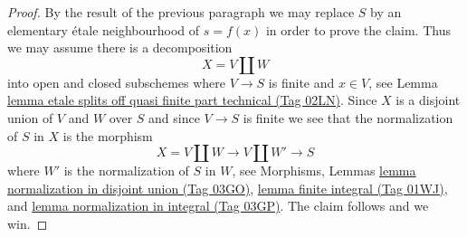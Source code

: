 \documentclass{amsart}
\theoremstyle{plain}
\theoremstyle{definition}
\theoremstyle{remark}
\numberwithin{equation}{subsection}
\begin{document}
\begin{proof}
\medskip\noindent
By the result of the previous paragraph we may replace $S$ by an
elementary \'etale neighbourhood of $s = f(x)$ in order to prove the claim.
Thus we may assume there is a decomposition
$$
X = V \amalg W
$$
into open and closed subschemes where $V \to S$ is finite and $x \in V$,
see Lemma \href{https://stacks.math.columbia.edu/tag/02LN}{lemma etale splits off quasi finite part technical (Tag 02LN)}.
Since $X$ is a disjoint union of $V$ and $W$ over $S$ and since
$V \to S$ is finite we see that the
normalization of $S$ in $X$ is the morphism
$$
X = V \amalg W \longrightarrow V \amalg W' \longrightarrow S
$$
where $W'$ is the normalization of $S$ in $W$, see
Morphisms, Lemmas \href{https://stacks.math.columbia.edu/tag/03GO}{lemma normalization in disjoint union (Tag 03GO)},
\href{https://stacks.math.columbia.edu/tag/01WJ}{lemma finite integral (Tag 01WJ)}, and
\href{https://stacks.math.columbia.edu/tag/03GP}{lemma normalization in integral (Tag 03GP)}.
The claim follows and we win.
\end{proof}
\end{document}
